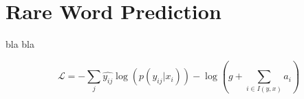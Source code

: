 \chapter{Rare Word Prediction}

bla bla 

\begin{equation}
\mathcal{L}=-\sum_{j} \hat{y_{ij}}\log(p(y_{ij}|x_i)) -\log(g + \sum_{i \in I(y,x)}a_i)
\end{equation}